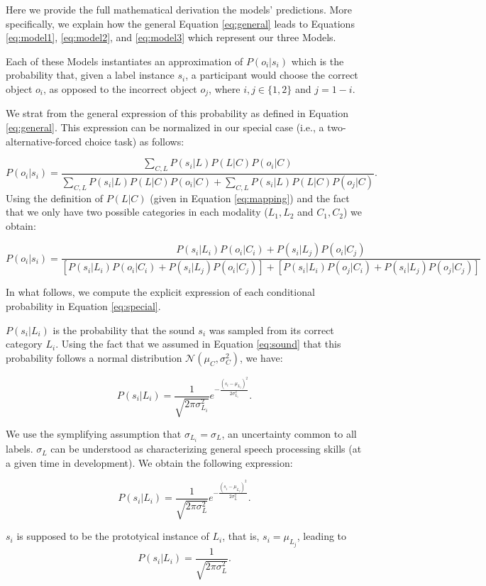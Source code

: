 \documentclass[english,,man]{apa6}
\begin{document}
Here we provide the full mathematical derivation the models' predictions. More specifically, we explain how the general Equation \ref{eq:general} leads to Equations \ref{eq:model1}, \ref{eq:model2}, and \ref{eq:model3} which represent our three Models.

Each of these Models instantiates an approximation of \(P(o_i|s_i)\) which is the probability that, given a label instance \(s_i\), a participant would choose the correct object \(o_i\), as opposed to the incorrect object \(o_{j}\), where \(i, j \in \{1,2\}\) and \(j = 1-i\).

We strat from the general expression of this probability as defined in Equation \ref{eq:general}. This expression can be normalized in our special case (i.e., a two-alternative-forced choice task) as follows:

\[P(o_i|s_i) = \frac{\sum_{C,L} P(s_i|L)P(L|C)P(o_i|C)}{\sum_{C,L}  P(s_i|L)P(L|C)P(o_i|C) + \sum_{C,L}  P(s_i|L)P(L|C)P(o_j|C)}.\]
Using the definition of \(P(L|C)\) (given in Equation \ref{eq:mapping}) and the fact that we only have two possible categories in each modality (\(L_1, L_2\) and \(C_1, C_2\)) we obtain:

\begin{equation} \label{eq:special}
P(o_i|s_i) = \frac{P(s_i|L_i)P(o_i|C_i) + P(s_i|L_j)P(o_i|C_j)}{[P(s_i|L_i)P(o_i|C_i) + P(s_i|L_j)P(o_i|C_j)] + [P(s_i|L_i)P(o_j|C_i) + P(s_i|L_j)P(o_j|C_j)]}
\end{equation}

In what follows, we compute the explicit expression of each conditional probability in Equation \ref{eq:special}.

\(P(s_i | L_i)\) is the probability that the sound \(s_i\) was sampled from its correct category \(L_i\). Using the fact that we assumed in Equation \ref{eq:sound} that this probability follows a normal distribution \(\mathcal{N}(\mu_C, \sigma^2_C)\), we have:

\[P(s_i|L_i) = \frac{1}{\sqrt{2\pi\sigma^2_{L_i}}}e^{-\frac{(s_i-\mu_{L_j})^2}{2\sigma^2_{L_i}}}.\]

We use the symplifying assumption that \(\sigma_{L_i} = \sigma_L\), an uncertainty common to all labels. \(\sigma_L\) can be understood as characterizing general speech processing skills (at a given time in development). We obtain the following expression:

\[P(s_i | L_i) = \frac{1}{\sqrt{2\pi\sigma^2_L}} e^{-\frac{(s_i-\mu_{L_j})^2}{2\sigma^2_L}}.\]

\(s_i\) is supposed to be the prototyical instance of \(L_i\), that is, \(s_i=\mu_{L_j}\), leading to \[P(s_i | L_i) = \frac{1}{\sqrt{2\pi\sigma^2_L}}.\]
\end{document}
